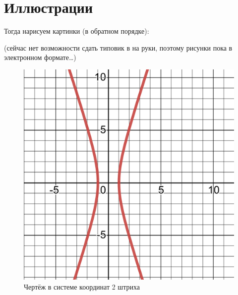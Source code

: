 \documentclass[12pt, a4paper]{article}
\begin{document}
    \section{Иллюстрации}
    Тогда нарисуем картинки (в обратном порядке):

    (сейчас нет возможности сдать типовик в на руки, поэтому рисунки пока в электронном формате…)

    \begin{figure}[h!]
        \centering
        \includegraphics[width=\textwidth]{resources/1.7_two_strokes.pdf}
        \caption{Чертёж в системе координат 2 штриха}
        \label{fig:main_figure}
    \end{figure}
    \FloatBarrier
\end{document}
